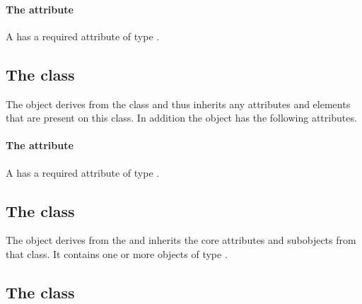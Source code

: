\paragraph{The \fixttspace{} attribute}

A \ThingA has a required attribute  of type .


\subsection{The  class}
\label{thingb-class}




The \ThingB object derives from the \SBase class and thus inherits any
attributes and elements that are present on this class.
In addition the \ThingB object has the following attributes.

\paragraph{The \fixttspace{} attribute}

A \ThingB has a required attribute  of type .


\subsection{The  class}
\label{listofthingcs-class}


The \ListOfThingCs object derives from the  and inherits
the core attributes and subobjects from that class. It contains one or
more objects of type \ThingC.

\subsection{The  class}
\label{thingc-class}

